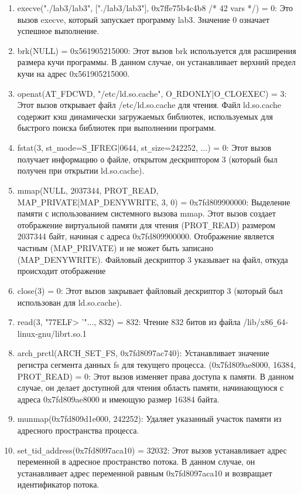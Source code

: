 \documentclass[a4paper, 14pt]{article}
\begin{document}
\begin{enumerate}
    \item execve("./lab3/lab3", ["./lab3/lab3"], 0x7ffe75b4c4b8 /* 42 vars */) = 0: Это вызов execve, который запускает программу lab3. Значение 0 означает успешное выполнение.
    \item brk(NULL) = 0x561905215000: Этот вызов brk используется для расширения размера кучи программы. В данном случае, он устанавливает верхний предел кучи на адрес 0x561905215000.
    \item openat(AT\texttt{\_}FDCWD, "/etc/ld.so.cache", O\texttt{\_}RDONLY|O\texttt{\_}CLOEXEC) = 3: Этот вызов открывает файл /etc/ld.so.cache для чтения. Файл ld.so.cache содержит кэш динамически загружаемых библиотек, используемых для быстрого поиска библиотек при выполнении программ.
    \item fstat(3, {st\texttt{\_}mode=S\texttt{\_}IFREG|0644, st\texttt{\_}size=242252, ...}) = 0: Этот вызов получает информацию о файле, открытом дескриптором 3 (который был получен при открытии ld.so.cache).
    \item mmap(NULL, 2037344, PROT\texttt{\_}READ, MAP\texttt{\_}PRIVATE|MAP\texttt{\_}DENYWRITE, 3, 0) = 0x7fd809900000: Выделение памяти с использованием системного вызова mmap. Этот вызов создает отображение виртуальной памяти для чтения (PROT\texttt{\_}READ) размером 2037344 байт, начиная с адреса 0x7fd809900000. Отображение является частным (MAP\texttt{\_}PRIVATE) и не может быть записано (MAP\texttt{\_}DENYWRITE). Файловый дескриптор 3 указывает на файл, откуда происходит отображение
    \item close(3) = 0: Этот вызов закрывает файловый дескриптор 3 (который был использован для ld.so.cache).
    \item read(3, "\177ELF\2\1\1\0\0\0\0\0\0\0\0\0\3\0>\0\1\0\0\0 '\0\0\0\0\0\0"..., 832) = 832: Чтение 832 битов из файла /lib/x86\texttt{\_}64-linux-gnu/librt.so.1
    \item arch\texttt{\_}prctl(ARCH\texttt{\_}SET\texttt{\_}FS, 0x7fd8097ac740): Устанавливает значение регистра сегмента данных fs для текущего процесса.
    \itemmprotect(0x7fd809ae8000, 16384, PROT\texttt{\_}READ) = 0: Этот вызов изменяет права доступа к памяти. В данном случае, он делает доступной для чтения область памяти, начинающуюся с адреса 0x7fd809ae8000 и имеющую размер 16384 байта.
    \item munmap(0x7fd809d1e000, 242252): Удаляет указанный участок памяти из адресного пространства процесса.
    \item set\texttt{\_}tid\texttt{\_}address(0x7fd8097aca10) = 32032: Этот вызов устанавливает адрес переменной в адресное пространство потока. В данном случае, он устанавливает адрес переменной равным 0x7fd8097aca10 и возвращает идентификатор потока.

\end{enumerate}
\end{document}
